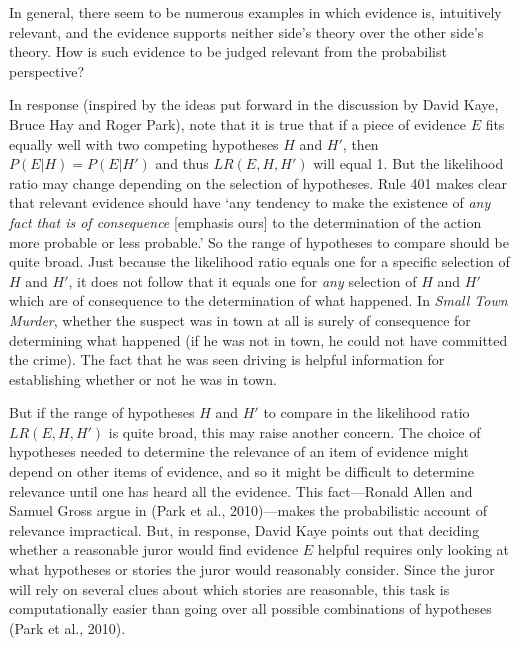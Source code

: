 \documentclass[
  10pt,
  dvipsnames,enabledeprecatedfontcommands]{scrartcl}
\begin{document}
\noindent In general, there seem to be numerous examples in which
evidence is, intuitively relevant, and the evidence supports neither
side's theory over the other side's theory. How is such evidence to be
judged relevant from the probabilist perspective?

In response (inspired by the ideas put forward in the discussion by
David Kaye, Bruce Hay and Roger Park), note that it is true that if a
piece of evidence \(E\) fits equally well with two competing hypotheses
\(H\) and \(H'\), then \(P(E\vert H)=P(E\vert H')\) and thus
\(LR(E,H,H')\) will equal 1. But the likelihood ratio may change
depending on the selection of hypotheses. Rule 401 makes clear that
relevant evidence should have `any tendency to make the existence of
\emph{any fact that is of consequence} {[}emphasis ours{]} to the
determination of the action more probable or less probable.' So the
range of hypotheses to compare should be quite broad. Just because the
likelihood ratio equals one for a specific selection of \(H\) and
\(H'\), it does not follow that it equals one for \textit{any} selection
of \(H\) and \(H'\) which are of consequence to the determination of
what happened. In \textit{Small Town Murder}, whether the suspect was in
town at all is surely of consequence for determining what happened (if
he was not in town, he could not have committed the crime). The fact
that he was seen driving is helpful information for establishing whether
or not he was in town.

But if the range of hypotheses \(H\) and \(H'\) to compare in the
likelihood ratio \(LR(E, H, H')\) is quite broad, this may raise another
concern. The choice of hypotheses needed to determine the relevance of
an item of evidence might depend on other items of evidence, and so it
might be difficult to determine relevance until one has heard all the
evidence. This fact---Ronald Allen and Samuel Gross argue in (Park et
al., 2010)---makes the probabilistic account of relevance impractical.
But, in response, David Kaye points out that deciding whether a
reasonable juror would find evidence \(E\) helpful requires only looking
at what hypotheses or stories the juror would reasonably consider. Since
the juror will rely on several clues about which stories are reasonable,
this task is computationally easier than going over all possible
combinations of hypotheses (Park et al., 2010).

\vspace{1mm}
\footnotesize

\normalsize
\end{document}
